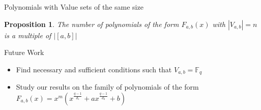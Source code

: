 \documentclass{beamer}
\newtheorem{proposition}{Proposition}
\begin{document}
\begin{frame}{Polynomials with Value sets of the same size}
  \begin{proposition}
    The number of polynomials of the form $F_{a, b}(x)$ with $|V_{a, b}| = n$ is a multiple of $|[a, b]|$
  \end{proposition}
\end{frame}

\begin{frame}{Future Work}
  \begin{itemize}
    \item Find necessary and sufficient conditions such that $V_{a,b} = \mathbb{F}_q$
    \item Study our results on the family of polynomials of the form $F_{a,b}(x) = x^m(x^{\frac{q-1}{d_1}} + ax^{\frac{q-1}{d_2}} +b)$
  \end{itemize}
\end{frame}

\end{document}

